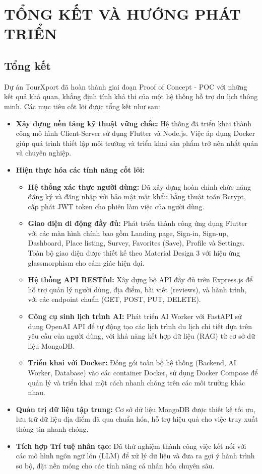 \chapter{TỔNG KẾT VÀ HƯỚNG PHÁT TRIỂN}

\section{Tổng kết}
Dự án TourXport đã hoàn thành giai đoạn Proof of Concept - POC với những kết quả khả quan, khẳng định tính khả thi của một hệ thống hỗ trợ du lịch thông minh. Các mục tiêu cốt lõi được tổng kết như sau:

\begin{itemize}
    \item \textbf{Xây dựng nền tảng kỹ thuật vững chắc:} Hệ thống đã triển khai thành công mô hình Client-Server sử dụng Flutter và Node.js. Việc áp dụng Docker giúp quá trình thiết lập môi trường và triển khai sản phẩm trở nên nhất quán và chuyên nghiệp.
    \item \textbf{Hiện thực hóa các tính năng cốt lõi:} 
    \begin{itemize}
        \item \textbf{Hệ thống xác thực người dùng:} Đã xây dựng hoàn chỉnh chức năng đăng ký và đăng nhập với bảo mật mật khẩu bằng thuật toán Bcrypt, cấp phát JWT token cho phiên làm việc của người dùng.
        \item \textbf{Giao diện di động đầy đủ:} Phát triển thành công ứng dụng Flutter với các màn hình chính bao gồm Landing page, Sign-in, Sign-up, Dashboard, Place listing, Survey, Favorites (Save), Profile và Settings. Toàn bộ giao diện được thiết kế theo Material Design 3 với hiệu ứng glassmorphism cho cảm giác hiện đại.
        \item \textbf{Hệ thống API RESTful:} Xây dựng bộ API đầy đủ trên Express.js để hỗ trợ quản lý người dùng, địa điểm, bài viết (reviews), và hành trình, với các endpoint chuẩn (GET, POST, PUT, DELETE).
        \item \textbf{Công cụ sinh lịch trình AI:} Phát triển AI Worker với FastAPI sử dụng OpenAI API để tự động tạo các lịch trình du lịch chi tiết dựa trên yêu cầu của người dùng, với khả năng kết hợp dữ liệu (RAG) từ cơ sở dữ liệu MongoDB.
        \item \textbf{Triển khai với Docker:} Đóng gói toàn bộ hệ thống (Backend, AI Worker, Database) vào các container Docker, sử dụng Docker Compose để quản lý và triển khai một cách nhanh chóng trên các môi trường khác nhau.
    \end{itemize}
    \item \textbf{Quản trị dữ liệu tập trung:} Cơ sở dữ liệu MongoDB được thiết kế tối ưu, lưu trữ dữ liệu địa điểm đã qua chuẩn hóa, hỗ trợ hiệu quả cho việc truy xuất thông tin nhanh chóng.
    \item \textbf{Tích hợp Trí tuệ nhân tạo:} Đã thử nghiệm thành công việc kết nối với các mô hình ngôn ngữ lớn (LLM) để xử lý dữ liệu và đưa ra gợi ý hành trình sơ bộ, đặt nền móng cho các tính năng cá nhân hóa chuyên sâu.
\end{itemize}

